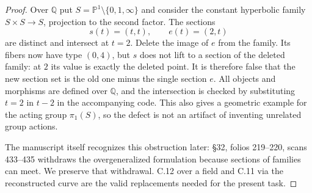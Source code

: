 \begin{proof}
Over $\mathbb Q$ put
$S=\mathbb P^1\setminus\{0,1,\infty\}$ and consider the
constant hyperbolic family $S\times S\to S$, projection to
the second factor.  The sections
\[
 s(t)=(t,t),\qquad e(t)=(2,t)
\]
are distinct and intersect at $t=2$.  Delete the image of
$e$ from the family.  Its fibers now have type $(0,4)$,
but $s$ does not lift to a section of the deleted family:
at $2$ its value is exactly the deleted point.  It is
therefore false that the new section set is the old one
minus the single section $e$.  All objects and morphisms
are defined over $\mathbb Q$, and the intersection is
checked by substituting $t=2$ in $t-2$ in the accompanying
code.  This also gives a geometric example for the acting
group $\pi_1(S)$, so the defect is not an artifact of
inventing unrelated group actions.

The manuscript itself recognizes this obstruction later:
\S32, folios 219--220, scans 433--435 withdraws the
overgeneralized formulation because sections of families
can meet.  We preserve that withdrawal.  C.12 over a
field and C.11 via the reconstructed curve are the
valid replacements needed for the present task.
\end{proof}
